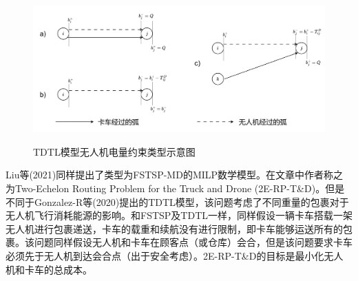 \begin{figure}[!htb]
    \centering
    \includegraphics[width=\linewidth]{images/tdtl.drawio.png}\\
    \caption{TDTL模型无人机电量约束类型示意图}
    \label{fig:tdtl-drone-battery}
\end{figure}


Liu等(2021)\cite{liuTwoEchelonRoutingProblem2021}同样提出了类型为FSTSP-MD的MILP数学模型。在文章中作者称之为Two-Echelon Routing Problem for the Truck and Drone (2E-RP-T\&D)。但是不同于Gonzalez-R等(2020)\cite{gonzalez-rTruckdroneTeamLogistics2020}提出的TDTL模型，该问题考虑了不同重量的包裹对于无人机飞行消耗能源的影响。和FSTSP及TDTL一样，同样假设一辆卡车搭载一架无人机进行包裹递送，卡车的载重和续航没有进行限制，即卡车能够运送所有的包裹。该问题同样假设无人机和卡车在顾客点（或仓库）会合，但是该问题要求卡车必须先于无人机到达会合点（出于安全考虑）。2E-RP-T\&D的目标是最小化无人机和卡车的总成本。

